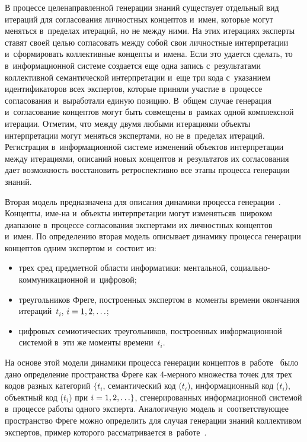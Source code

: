 {\begin{multicols}{2}
      В процессе целенаправленной генерации знаний существует отдельный вид 
итераций для согласования личностных концептов и~имен, которые могут меняться 
в~пределах итераций, но не между ними. На этих итерациях эксперты ставят своей целью 
согласовать между собой свои личностные интерпретации и~сформировать коллективные 
концепты и~имена. Если это удается сделать, то в~информационной системе создается еще 
одна запись с~результатами коллективной семантической интерпретации и~еще три кода 
с~указанием идентификаторов всех экспертов, которые приняли учас\-тие в~процессе 
согласования и~выработали единую позицию. В~общем случае генерация и~согласование 
концептов могут быть совмещены в~рамках одной комплексной итерации. Отметим, что 
между двумя любыми итерациями объекты интерпретации могут меняться экспертами, но 
не в~пределах итераций. Регистрация в~информационной системе изменений объектов 
интерпретации между итерациями, описаний новых концептов и~результатов их 
согласования дает возможность восстановить ретроспективно все этапы процесса генерации 
знаний.
      
      Вторая модель предназначена для описания динамики процесса 
      генерации~\cite{22-zat}. Концепты, име-\linebreak на и~объекты интерпретации могут 
изменяться\linebreak в~широком диапазоне в~процессе согласования экспертами их личностных 
концептов и~имен. По определению вторая модель описывает динамику процесса генерации 
концептов одним экспертом и~состоит из:
      \begin{itemize}
\item трех сред предметной области информатики: ментальной,  
со\-ци\-аль\-но-ком\-му\-ни\-ка\-ци\-он\-ной и~цифровой;
\item треугольников Фреге, построенных экспертом в~моменты времени 
окончания итераций~$t_i$, $i \hm= 1, 2,\ldots$;
\item цифровых семиотических треугольников, построенных информационной 
системой в~эти же моменты времени~$t_i$.
\end{itemize}

      На основе этой модели динамики процесса генерации концептов 
      в~работе~\cite{22-zat} было дано определение пространства Фреге как 4-мерного 
множества точек для трех кодов разных категорий $\{t_i$, семантический код ($t_i$), 
информационный код ($t_i$), объектный код ($t_i$) при $i \hm= 1, 2,\ldots\}$, 
сгенерированных информационной системой в~процессе работы одного эксперта. 
Аналогичную модель и~соответствующее пространство Фреге можно определить для случая 
генерации знаний коллективом экспертов, пример которого рассматривается 
      в~работе~\cite{23-zat}.
      

\end{multicols}}
